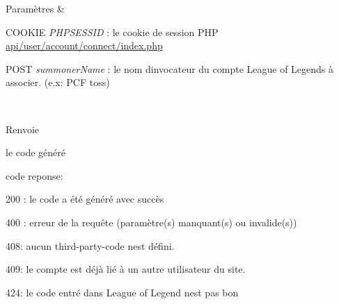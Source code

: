 \begin{DoxyParams}{Paramètres}
{\em } & 
\begin{DoxyItemize}
\item C\+O\+O\+K\+IE {\itshape P\+H\+P\+S\+E\+S\+S\+ID} \+: le cookie de session P\+HP \hyperlink{account_2connect_2index_8php}{api/user/account/connect/index.\+php}
\item P\+O\+ST {\itshape summoner\+Name} \+: le nom d\textquotesingle{}invocateur du compte League of Legends à associer. (e.\+x\+: \textquotesingle{}P\+CF toss\textquotesingle{}) 
\end{DoxyItemize}\\
\hline
\end{DoxyParams}
\begin{DoxyReturn}{Renvoie}

\begin{DoxyItemize}
\item le code généré
\item code reponse\+:
\begin{DoxyItemize}
\item 200 \+: le code a été généré avec succès
\item 400 \+: erreur de la requête (paramètre(s) manquant(s) ou invalide(s))
\item 408\+: aucun third-\/party-\/code n\textquotesingle{}est défini.
\item 409\+: le compte est déjà lié à un autre utilisateur du site.
\item 424\+: le code entré dans League of Legend n\textquotesingle{}est pas bon 
\end{DoxyItemize}
\end{DoxyItemize}
\end{DoxyReturn}
